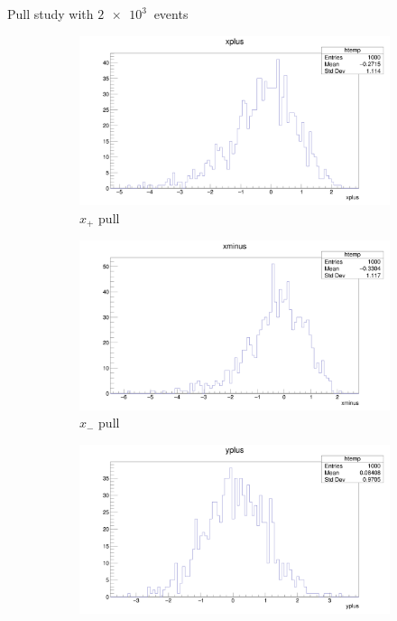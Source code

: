 \documentclass{beamer}
\begin{document}
\begin{frame}{Pull study with $\SI{2e3}{}$ events}
  \begin{figure}
    \centering
    \vspace{-0.2cm}
    \begin{subfigure}{0.5\textwidth}
      \includegraphics[width = 1.0\textwidth]{xplus1K1K.png}
      \caption{$x_+$ pull}
    \end{subfigure}%
    \begin{subfigure}{0.5\textwidth}
      \includegraphics[width = 1.0\textwidth]{xminus1K1K.png}
      \caption{$x_-$ pull}
    \end{subfigure}
    \begin{subfigure}{0.5\textwidth}
      \includegraphics[width = 1.0\textwidth]{yplus1K1K.png}

\end{subfigure}
\end{figure}
\end{frame}
\end{document}
